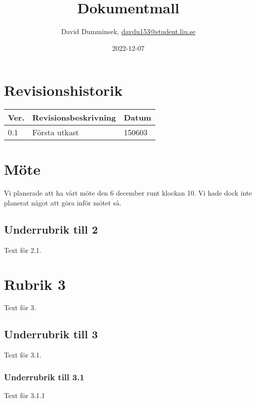 \documentclass{TDP003mall}
\author{David Dumminsek, \url{davdu153@student.liu.se}}
\title{Dokumentmall}
\date{2022-12-07}
\begin{document}
\projectpage
\section{Revisionshistorik}
\begin{table}[!h]
\begin{tabularx}{\linewidth}{|l|X|l|}
\hline
Ver. & Revisionsbeskrivning & Datum \\\hline
0.1 & Första utkast & 150603 \\\hline
\end{tabularx}
\end{table}


\section{Möte}
Vi planerade att ha vårt möte den 6 december runt klockan 10.
Vi hade dock inte planerat något att göra inför mötet så. 

\subsection{Underrubrik till 2}
Text för 2.1.

\section{Rubrik 3}
Text för 3.

\subsection{Underrubrik till 3}
Text för 3.1.

\subsubsection{Underrubrik till 3.1}
Text för 3.1.1
\end{document}
